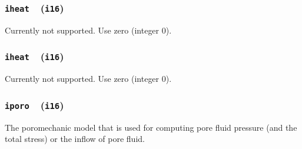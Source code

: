 \documentclass[letterpaper,11pt]{article}
\newcommand{\Var}[2]{\texttt{#1}\ \  (\texttt{#2})}
\begin{document}
\subsubsection[\texttt{iheat}]{\Var{iheat}{i16}}\label{sec:iheat}
Currently not supported.
Use zero (integer 0).
%
\subsubsection[\texttt{icoef}]{\Var{iheat}{i16}}\label{sec:icoef}
Currently not supported.
Use zero (integer 0).
%
\subsubsection[\texttt{iporo}]{\Var{iporo}{i16}}\label{sec:iporo}
The poromechanic model that is used for computing
pore fluid pressure (and the total stress) or the inflow
of pore fluid.
%
\end{document}
